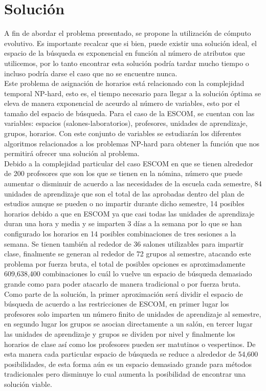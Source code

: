 \section{Solución}
	A fin de abordar el problema presentado, se propone la utilización de cómputo evolutivo. Es importante recalcar que si bien, puede existir una solución ideal, el espacio de la búsqueda es exponencial en función al número de atributos que utilicemos, por lo tanto encontrar esta solución podría tardar mucho tiempo o incluso podría darse el caso que no se encuentre nunca. \\
	
	Este problema de asignación de horarios está relacionado con la complejidad temporal NP-hard, esto es, el tiempo necesario para llegar a la solución óptima se eleva de manera exponencial de aceurdo al número de variables, esto por el tamaño del espacio de búsqueda. Para el caso de la ESCOM, se cuentan con las variables: espacios (salones-laboratorios), profesores, unidades de aprendizaje, grupos, horarios. Con este conjunto de variables se estudiarán los diferentes algoritmos relacionados a los problemas NP-hard para obtener la función que nos permitirá ofrecer una solución al problema.\\
	
	Debido a la complejidad particular del caso ESCOM en que se tienen alrededor de 200 profesores que son los que se tienen en la nómina, número que puede aumentar o disminuir de acuerdo a las necesidades de la escuela cada semestre, 84 unidades de aprendizaje que son el total de las aprobadas dentro del plan de estudios aunque se pueden o no impartir durante dicho semestre, 14 posibles horarios debido a que en ESCOM ya que casi todas las unidades de aprendizaje duran una hora y media y se imparten 3 días a la semana por lo que se han configurado los horarios en 14 posibles combinaciones de tres sesiones a la semana. Se tienen también al rededor de 36 salones utilizables para impartir clase, finalmente se generan al rededor de 72 grupos al semestre, atacando este problema por fuerza bruta, el total de posibles opciones es aproximadamente 609,638,400 combinaciones lo cuál lo vuelve un espacio de búsqueda demasiado grande como para poder atacarlo de manera tradicional o por fuerza bruta. \\
	
	Como parte de la solución, la primer aproximación será dividir el espacio de búsqueda de acuerdo a las restricciones de ESCOM, en primer lugar los profesores solo imparten un número finito de unidades de aprendizaje al semestre, en segundo lugar los grupos se asocian directamente a un salón, en tercer lugar las unidades de aprendizaje y grupos se dividen por nivel y finalmente los horarios de clase así como los profesores pueden ser matutinos o vespertinos. De esta manera cada particular espacio de búsqueda se reduce a alrededor de 54,600 posibilidades, de esta forma aún es un espacio demasiado grande para métodos tradicionales pero disminuye lo cual aumenta la posibilidad de encontrar una solución viable.\\
	
